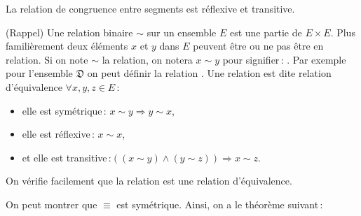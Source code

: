 \begin{axi}\label{axi-C2}
    La relation de congruence entre segments est réflexive et transitive.
\end{axi}
\begin{rema} (Rappel)
Une relation binaire $\sim$ sur un ensemble $E$ est une partie de $E\times E$. Plus familièrement deux éléments $x$ et $y$ dans $E$ peuvent être ou ne pas être en relation. Si on note $\sim$ la relation, on notera $x \sim y$ pour signifier\,: . Par exemple pour l'ensemble $\mathfrak{D}$ on peut définir la relation . Une relation est dite relation d'équivalence \ssi $\forall x,y,z\in E$\,:
\begin{itemize}[$\bullet$]
    \item elle est symétrique\,:  $x\sim y \Rightarrow y \sim x$,
    \item elle est réflexive\,: $x\sim x$,
    \item et elle est transitive\,:$((x\sim y)\wedge (y\sim z)) \Rightarrow x\sim z$.
\end{itemize}
On vérifie facilement que la relation  est une relation d'équivalence.
\end{rema}
\begin{rema}
    On peut montrer que $\equiv$ est symétrique. Ainsi, on a le théorème suivant\,:
\end{rema}
